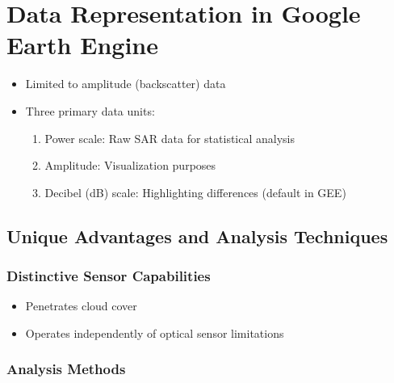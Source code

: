 \documentclass[
  letterpaper,
]{scrbook}
\providecommand{\tightlist}{%
  \setlength{\itemsep}{0pt}\setlength{\parskip}{0pt}}\usepackage{longtable,booktabs,array}
\begin{document}
\section{Data Representation in Google Earth
Engine}\label{data-representation-in-google-earth-engine}

\begin{itemize}
\item
  Limited to amplitude (backscatter) data
\item
  Three primary data units:

  \begin{enumerate}
  \def\labelenumi{\arabic{enumi}.}
  \item
    Power scale: Raw SAR data for statistical analysis
  \item
    Amplitude: Visualization purposes
  \item
    Decibel (dB) scale: Highlighting differences (default in GEE)
  \end{enumerate}
\end{itemize}

\subsection{Unique Advantages and Analysis
Techniques}\label{unique-advantages-and-analysis-techniques}

\subsubsection{Distinctive Sensor
Capabilities}\label{distinctive-sensor-capabilities}

\begin{itemize}
\tightlist
\item
  Penetrates cloud cover
\item
  Operates independently of optical sensor limitations
\end{itemize}

\subsubsection{Analysis Methods}\label{analysis-methods}
\end{document}
